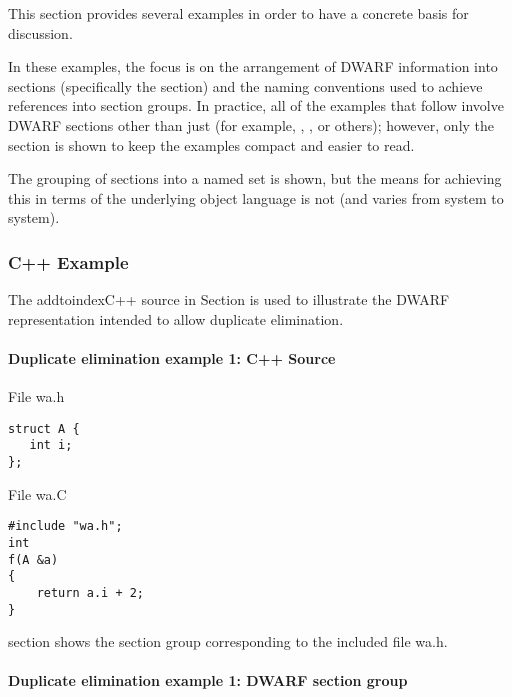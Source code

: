 This section provides several examples in order to have a
concrete basis for discussion.

In these examples, the focus is on the arrangement of DWARF
information into sections (specifically the 
section) and the naming conventions used to achieve references
into section groups. In practice, all of the examples that
follow involve DWARF sections other than just 
(for example, , 
, or others);
however, only the 
section is shown to keep the
examples compact and easier to read.

The grouping of sections into a named set is shown, but the means for achieving this in terms of
the underlying object language is not (and varies from system to system).

\subsubsection{C++ Example}

The addtoindex{C++} source in 
Section 
is used to illustrate the DWARF
representation intended to allow duplicate elimination.

\paragraph{Duplicate elimination example 1: C++ Source} 
\label{app:duplicateeliminationexample1csource}

File wa.h

\begin{lstlisting}
struct A {
   int i;
};
\end{lstlisting}

File wa.C

\begin{lstlisting}
#include "wa.h";
int
f(A &a)
{
    return a.i + 2;
}
\end{lstlisting}


section 
shows the section group corresponding to the included file 
wa.h.


\paragraph{Duplicate elimination example 1: DWARF section group} 

